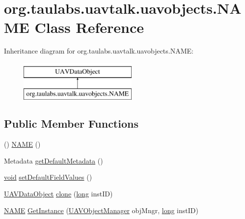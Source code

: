 \hypertarget{classorg_1_1taulabs_1_1uavtalk_1_1uavobjects_1_1_n_a_m_e}{\section{org.\-taulabs.\-uavtalk.\-uavobjects.\-N\-A\-M\-E Class Reference}
\label{classorg_1_1taulabs_1_1uavtalk_1_1uavobjects_1_1_n_a_m_e}
}
Inheritance diagram for org.\-taulabs.\-uavtalk.\-uavobjects.\-N\-A\-M\-E\-:\begin{figure}[H]
\begin{center}
\leavevmode
\includegraphics[height=2.000000cm]{classorg_1_1taulabs_1_1uavtalk_1_1uavobjects_1_1_n_a_m_e}
\end{center}
\end{figure}
\subsection*{Public Member Functions}
\begin{DoxyCompactItemize}
\item 
() \hyperlink{classorg_1_1taulabs_1_1uavtalk_1_1uavobjects_1_1_n_a_m_e_ad54e38b7f21114c135b4d1cf28e27275}{N\-A\-M\-E} ()
\item 
Metadata \hyperlink{classorg_1_1taulabs_1_1uavtalk_1_1uavobjects_1_1_n_a_m_e_a5524173356faaf67077e6ba5adbfe24d}{get\-Default\-Metadata} ()
\item 
\hyperlink{group___u_a_v_objects_plugin_ga444cf2ff3f0ecbe028adce838d373f5c}{void} \hyperlink{classorg_1_1taulabs_1_1uavtalk_1_1uavobjects_1_1_n_a_m_e_a7dd995fe8596a41f14d50f06a5beb63e}{set\-Default\-Field\-Values} ()
\item 
\hyperlink{class_u_a_v_data_object}{U\-A\-V\-Data\-Object} \hyperlink{group___u_a_v_objects_plugin_ga7f66b07acd0bb68e43924835ef73a1d2}{clone} (\hyperlink{ioapi_8h_a3c7b35ad9dab18b8310343c201f7b27e}{long} inst\-I\-D)
\item 
\hyperlink{classorg_1_1taulabs_1_1uavtalk_1_1uavobjects_1_1_n_a_m_e}{N\-A\-M\-E} \hyperlink{group___u_a_v_objects_plugin_ga23fdfcabbed3bf6b2d0a58ea85ce567b}{Get\-Instance} (\hyperlink{class_u_a_v_object_manager}{U\-A\-V\-Object\-Manager} obj\-Mngr, \hyperlink{ioapi_8h_a3c7b35ad9dab18b8310343c201f7b27e}{long} inst\-I\-D)
\end{DoxyCompactItemize}
